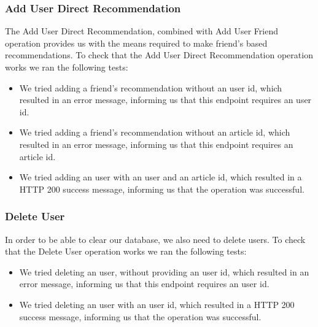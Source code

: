 \subsubsection{Add User Direct Recommendation}
\label{sec:basic-operations-add-user}
The Add User Direct Recommendation, combined with Add User Friend operation provides us with the means required to make friend's based recommendations. To check that the Add User Direct Recommendation operation works we ran the following tests: 
\begin{itemize}
	\item We tried adding a friend's recommendation without an user id, which resulted in an error message, informing us that this endpoint requires an user id.
	\item We tried adding a friend's recommendation without an article id, which resulted in an error message, informing us that this endpoint requires an article id.
	\item We tried adding an user with an user and an article id, which resulted in a HTTP 200 success message, informing us that the operation was successful.
\end{itemize}

\subsubsection{Delete User}
\label{sec:basic-operations-add-user}
In order to be able to clear our database, we also need to delete users. To check that the Delete User operation works we ran the following tests: 
\begin{itemize}
	\item We tried deleting an user, without providing an user id, which resulted in an error message, informing us that this endpoint requires an user id.
	\item We tried deleting an user with an user id, which resulted in a HTTP 200 success message, informing us that the operation was successful.
\end{itemize}


